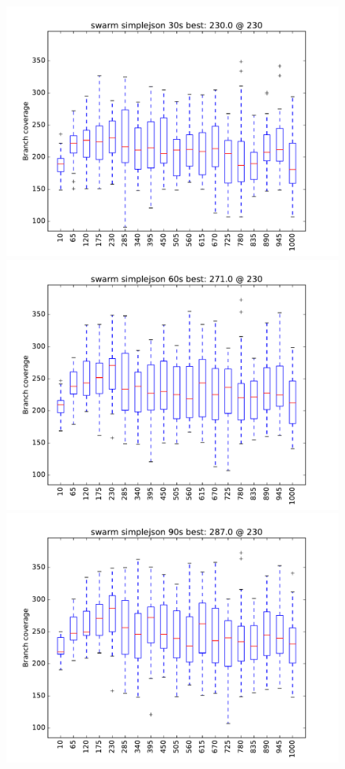 \begin{figure}
\includegraphics[width=\columnwidth]{graphs/simplejsonswarm30}
\includegraphics[width=\columnwidth]{graphs/simplejsonswarm60}
\includegraphics[width=\columnwidth]{graphs/simplejsonswarm90}
\end{figure}


